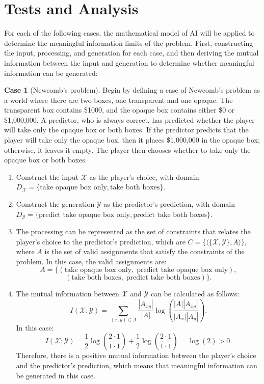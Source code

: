 \documentclass[stu,12pt]{apa7}
\theoremstyle{definition}
\newtheorem{case}{Case}[section]
\begin{document}
\section{Tests and Analysis}

For each of the following cases, the mathematical model of AI will be applied to determine the meaningful information limits of the problem. First, constructing the input, processing, and generation for each case, and then deriving the mutual information between the input and generation to determine whether meaningful information can be generated:
\begin{case}[Newcomb's problem]
    Begin by defining a case of Newcomb's problem as a world where there are two boxes, one transparent and one opaque. The transparent box contains \$1000, and the opaque box contains either \$0 or \$1,000,000. A predictor, who is always correct, has predicted whether the player will take only the opaque box or both boxes. If the predictor predicts that the player will take only the opaque box, then it places \$1,000,000 in the opaque box; otherwise, it leaves it empty. The player then chooses whether to take only the opaque box or both boxes.
    \begin{enumerate}
        \item Construct the input $\mathcal{X}$ as the player's choice, with domain $D_\mathcal{X} = \{\text{take opaque box only}, \text{take both boxes}\}$.
        \item Construct the generation $\mathcal{Y}$ as the predictor's prediction, with domain $D_\mathcal{Y} = \{\text{predict take opaque box only}, \text{predict take both boxes}\}$.
        \item The processing can be represented as the set of constraints that relates the player's choice to the predictor's prediction, which are $C = \{\langle \{\mathcal{X},\mathcal{Y}\}, A \rangle\}$, where $A$ is the set of valid assignments that satisfy the constraints of the problem. In this case, the valid assignments are:
        \[
        A = \{(\text{take opaque box only},\; \text{predict take opaque box only}),
        \]\[
        (\text{take both boxes},\; \text{predict take both boxes})\}.
        \]
        \item The mutual information between $\mathcal{X}$ and $\mathcal{Y}$ can be calculated as follows:
        \[
        I(\mathcal{X};\mathcal{Y}) = \sum_{(x,y) \in A}
        \frac{|A_{xy}|}{|A|}
        \log\!\left(\frac{|A| |A_{xy}|}{|A_x||A_y|}\right).
        \]
        In this case:
        \[I(\mathcal{X};\mathcal{Y}) = \frac{1}{2} \log\!\left(\frac{2 \cdot 1}{1 \cdot 1}\right) + \frac{1}{2} \log\!\left(\frac{2 \cdot 1}{1 \cdot 1}\right) = \log(2) > 0.
        \]
        Therefore, there is a positive mutual information between the player's choice and the predictor's prediction, which means that meaningful information can be generated in this case.
    \end{enumerate}
\end{case}
\end{document}
